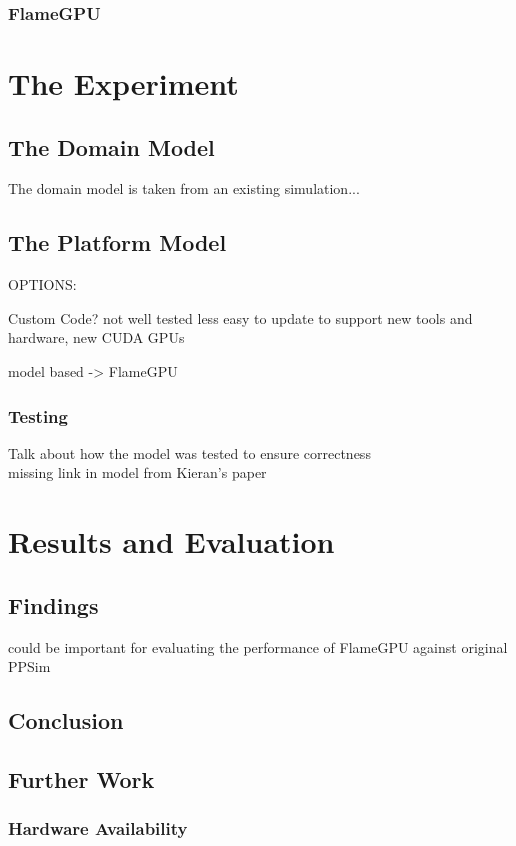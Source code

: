 \documentclass{UoYCSproject}
\begin{document}
\subsection{FlameGPU}

\chapter{The Experiment}
\section{The Domain Model}
The domain model is taken from an existing simulation...

\section{The Platform Model}
OPTIONS:

Custom Code?\cite{phil_diss}
not well tested
less easy to update to support new tools and hardware, new CUDA GPUs


model based -> FlameGPU\cite{flame_keratinocyte}

\subsection{Testing}
Talk about how the model was tested to ensure correctness\\
missing link in model from Kieran's paper 

\chapter{Results and Evaluation}
\section{Findings}
\cite{statistical_tests} could be important for evaluating the performance of FlameGPU against original PPSim


\section{Conclusion}

\section{Further Work}
\subsection{Hardware Availability}
\end{document}
